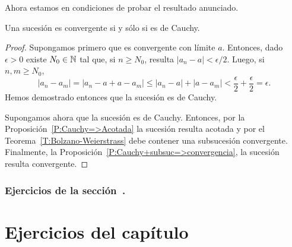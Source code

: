 Ahora estamos en condiciones de probar el resultado anunciado.

\begin{theorem}\label{T:converge sii Cauchy}
    Una sucesión es convergente si y sólo si es de Cauchy.
\end{theorem}

\begin{proof}
    Supongamos primero que \sucan es convergente con límite $a$. Entonces, dado $\epsilon>0$ existe $N_0\in\mathbb{N}$ tal que, si $n\ge N_0$, resulta $|a_n-a|<\epsilon/2$.
    Luego, si $n,m\ge N_0$,
    \[
    |a_n - a_m| = |a_n - a + a - a_m| \le |a_n-a| + |a-a_m| 
    < \frac\epsilon2 + \frac\epsilon2 = \epsilon.
    \]
    Hemos demostrado entonces que la sucesión es de Cauchy.

    Supongamos ahora que la sucesión es de Cauchy. Entonces, por la Proposición~\ref{P:Cauchy=>Acotada} la sucesión resulta acotada y por el Teorema~\ref{T:Bolzano-Weierstrass} debe contener una subsucesión convergente.
    Finalmente, la Proposición~\ref{P:Cauchy+subsuc=>convergencia}, la sucesión resulta convergente.
\end{proof}

\subsubsection*{Ejercicios de la sección~.}

\begin{enumerate}

\end{enumerate}

\section{Ejercicios del capítulo~}
\begin{enumerate}











\end{enumerate}


